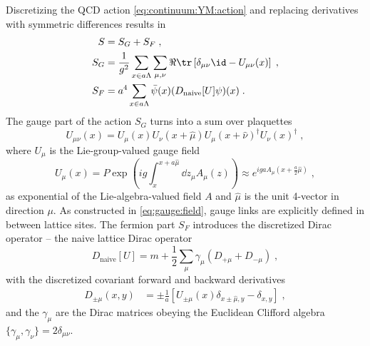 Discretizing the QCD action \cref{eq:continuum:YM:action} and replacing derivatives with symmetric differences results in
\begin{align}
S &= S_G + S_F \;, \\
S_G &= \frac{1}{g^2} \sum_{x \in a \Lambda} \sum_{\mu, \nu} \Re \tr \left[ \delta_{\mu \nu} \id - U_{\mu \nu}(x) \right] \;, \\
S_F &= a^4 \sum_{x \in a \Lambda} \bar{\psi}(x) (D_{\text{naive}}[U] \psi)(x) \;.
\end{align}
The gauge part of the action $S_G$ turns into a sum over plaquettes
\begin{equation}
U_{\mu \nu}(x)
= U_{\mu}(x) U_{\nu}(x + \hat{\mu}) U_{\mu}(x + \hat{\nu})^{\dagger} U_{\nu}(x)^{\dagger} \;,
\end{equation}
where $U_{\mu}$ is the Lie-group-valued gauge field
\begin{equation} \label{eq:gauge:field}
U_{\mu}(x)
= P \exp(i g \int_x^{x + a \hat{\mu}} \dd z_{\mu} A_{\mu}(z) )
\approx e^{i g a A_{\mu}(x + \frac{a}{2} \hat{\mu})} \;,
\end{equation}
as exponential of the Lie-algebra-valued field $A$ and $\hat{\mu}$ is the unit 4-vector in direction $\mu$.
As constructed in \cref{eq:gauge:field}, gauge links are explicitly defined in between lattice sites.
The fermion part $S_F$ introduces the discretized Dirac operator -- the naive lattice Dirac operator
\begin{equation}
D_{\text{naive}}[U] = m + \frac{1}{2} \sum_{\mu} \gamma_{\mu} \left( D_{+\mu} + D_{- \mu} \right) \;,
\end{equation}
with the discretized covariant forward and backward derivatives
\begin{align}
D_{\pm \mu}(x,y) &= \pm \frac{1}{a} \left[ U_{\pm \mu}(x) \delta_{x \pm \hat{\mu}, y} - \delta_{x,y} \right] \;,
\end{align}
and the $\gamma_{\mu}$ are the Dirac matrices obeying the Euclidean Clifford algebra $\{\gamma_{\mu}, \gamma_{\nu}\} = 2 \delta_{\mu \nu}$.

